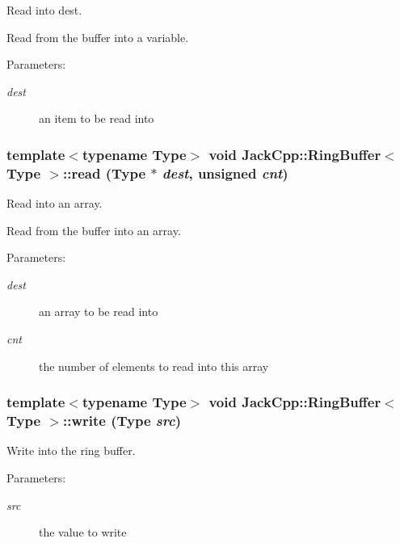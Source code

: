Read into dest. 

Read from the buffer into a variable.

\begin{Desc}
\item[Parameters:]
\begin{description}
\item[{\em dest}]an item to be read into \end{description}
\end{Desc}
\subsubsection[read]{\setlength{\rightskip}{0pt plus 5cm}template$<$typename Type$>$ void {\bf JackCpp::RingBuffer}$<$ Type $>$::read (Type $\ast$ {\em dest}, \/  unsigned {\em cnt})\hspace{0.3cm}{\tt  [inline]}}\label{classJackCpp_1_1RingBuffer_1522bf1e34fa3d6cc2dec801729676fa}


Read into an array. 

Read from the buffer into an array.

\begin{Desc}
\item[Parameters:]
\begin{description}
\item[{\em dest}]an array to be read into \item[{\em cnt}]the number of elements to read into this array \end{description}
\end{Desc}
\subsubsection[write]{\setlength{\rightskip}{0pt plus 5cm}template$<$typename Type$>$ void {\bf JackCpp::RingBuffer}$<$ Type $>$::write (Type {\em src})\hspace{0.3cm}{\tt  [inline]}}\label{classJackCpp_1_1RingBuffer_55cf95cecda37304365a8bbfb69d750d}


Write into the ring buffer. 

\begin{Desc}
\item[Parameters:]
\begin{description}
\item[{\em src}]the value to write \end{description}
\end{Desc}
